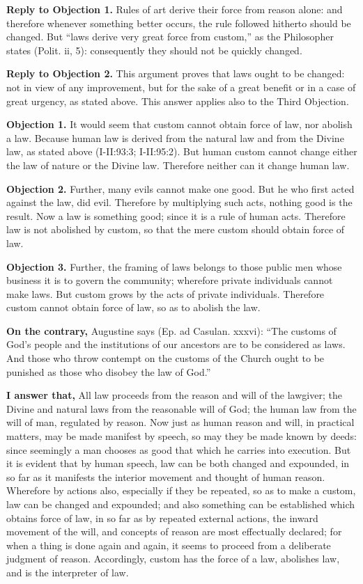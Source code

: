 \textbf{Reply to Objection 1.} Rules of art derive their force from reason alone: and therefore whenever something better occurs, the rule followed hitherto should be changed. But ``laws derive very great force from custom,'' as the Philosopher states (Polit. ii, 5): consequently they should not be quickly changed.

\textbf{Reply to Objection 2.} This argument proves that laws ought to be changed: not in view of any improvement, but for the sake of a great benefit or in a case of great urgency, as stated above. This answer applies also to the Third Objection.


\textbf{Objection 1.} It would seem that custom cannot obtain force of law, nor abolish a law. Because human law is derived from the natural law and from the Divine law, as stated above (I-II:93:3; I-II:95:2). But human custom cannot change either the law of nature or the Divine law. Therefore neither can it change human law.

\textbf{Objection 2.} Further, many evils cannot make one good. But he who first acted against the law, did evil. Therefore by multiplying such acts, nothing good is the result. Now a law is something good; since it is a rule of human acts. Therefore law is not abolished by custom, so that the mere custom should obtain force of law.

\textbf{Objection 3.} Further, the framing of laws belongs to those public men whose business it is to govern the community; wherefore private individuals cannot make laws. But custom grows by the acts of private individuals. Therefore custom cannot obtain force of law, so as to abolish the law.

\textbf{On the contrary,} Augustine says (Ep. ad Casulan. xxxvi): ``The customs of God's people and the institutions of our ancestors are to be considered as laws. And those who throw contempt on the customs of the Church ought to be punished as those who disobey the law of God.''

\textbf{I answer that,} All law proceeds from the reason and will of the lawgiver; the Divine and natural laws from the reasonable will of God; the human law from the will of man, regulated by reason. Now just as human reason and will, in practical matters, may be made manifest by speech, so may they be made known by deeds: since seemingly a man chooses as good that which he carries into execution. But it is evident that by human speech, law can be both changed and expounded, in so far as it manifests the interior movement and thought of human reason. Wherefore by actions also, especially if they be repeated, so as to make a custom, law can be changed and expounded; and also something can be established which obtains force of law, in so far as by repeated external actions, the inward movement of the will, and concepts of reason are most effectually declared; for when a thing is done again and again, it seems to proceed from a deliberate judgment of reason. Accordingly, custom has the force of a law, abolishes law, and is the interpreter of law.

